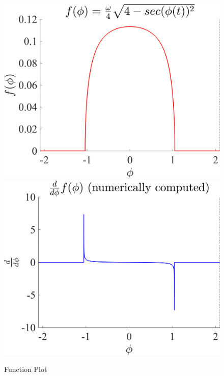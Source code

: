 \documentclass[11pt]{article}
\begin{document}
\begin{figure}[H]
\centering
\includegraphics[width=.45\linewidth]{9_3}
\includegraphics[width=.45\linewidth]{9_3_2}
\caption{Function Plot}
\end{figure}
\end{document}
